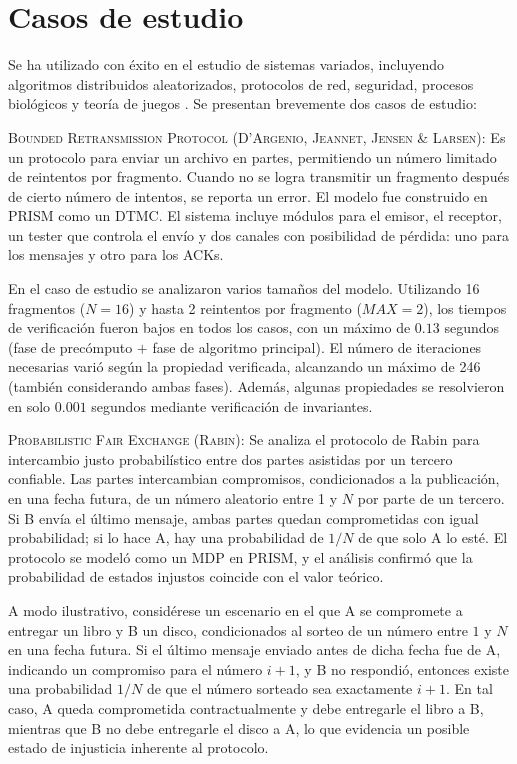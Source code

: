 \documentclass[runningheads]{llncs}
\begin{document}
\section{Casos de estudio}
Se ha utilizado con éxito en el estudio de sistemas variados, incluyendo algoritmos distribuidos aleatorizados, protocolos de red, seguridad, procesos biológicos y teoría de juegos \cite{PRISMCaseStudies}. Se presentan brevemente dos casos de estudio:

\vspace{.5em}

\textsc{Bounded Retransmission Protocol (D'Argenio, Jeannet, Jensen \& Larsen)}\cite{PRISMBRP}:  Es un protocolo para enviar un archivo en partes, permitiendo un número limitado de reintentos por fragmento. Cuando no se logra transmitir un fragmento después de cierto número de intentos, se reporta un error. El modelo fue construido en PRISM como un DTMC. El sistema incluye módulos para el emisor, el receptor, un tester que controla el envío y dos canales con posibilidad de pérdida: uno para los mensajes y otro para los ACKs.

En el caso de estudio se analizaron varios tamaños del modelo. Utilizando 16 fragmentos ($N = 16$) y hasta 2 reintentos por fragmento ($MAX = 2$), los tiempos de verificación fueron bajos en todos los casos, con un máximo de $0.13$ segundos (fase de precómputo $+$ fase de algoritmo principal). El número de iteraciones necesarias varió según la propiedad verificada, alcanzando un máximo de 246 (también considerando ambas fases). Además, algunas propiedades se resolvieron en solo $0.001$ segundos mediante verificación de invariantes.

\vspace{.5em}

\textsc{Probabilistic Fair Exchange (Rabin)}\cite{PRISMFairExchange}: Se analiza el protocolo de Rabin para intercambio justo probabilístico entre dos partes asistidas por un tercero confiable. Las partes intercambian compromisos, condicionados a la publicación, en una fecha futura, de un número aleatorio entre 1 y $N$ por parte de un tercero. Si B envía el último mensaje, ambas partes quedan comprometidas con igual probabilidad; si lo hace A, hay una probabilidad de $1/N$ de que solo A lo esté. El protocolo se modeló como un MDP en PRISM, y el análisis confirmó que la probabilidad de estados injustos coincide con el valor teórico.

A modo ilustrativo, considérese un escenario en el que A se compromete a entregar un libro y B un disco, condicionados al sorteo de un número entre $1$ y $N$ en una fecha futura. Si el último mensaje enviado antes de dicha fecha fue de A, indicando un compromiso para el número $i+1$, y B no respondió, entonces existe una probabilidad $1/N$ de que el número sorteado sea exactamente $i+1$. En tal caso, A queda comprometida contractualmente y debe entregarle el libro a B, mientras que B no debe entregarle el disco a A, lo que evidencia un posible estado de injusticia inherente al protocolo.
\end{document}
